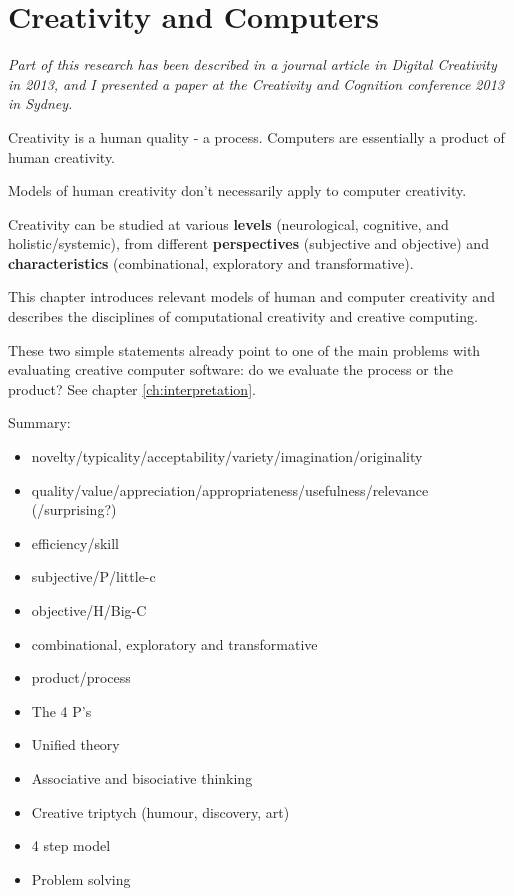 
\chapter{Creativity and Computers}
\label{ch:creativity}

\emph{Part of this research has been described in a journal article in Digital Creativity in 2013, and I presented a paper at the Creativity and Cognition conference 2013 in Sydney.}

\grule


Creativity is a human quality - a process. Computers are essentially a product of human creativity.

Models of human creativity don't necessarily apply to computer creativity.

Creativity can be studied at various \textbf{levels} (neurological, cognitive, and holistic/systemic), from different \textbf{perspectives} (subjective and objective) and \textbf{characteristics} (combinational, exploratory and transformative).

This chapter introduces relevant models of human and computer creativity and describes the disciplines of computational creativity and creative computing.

\begin{draft}
  These two simple statements already point to one of the main problems with evaluating creative computer software: do we evaluate the process or the product? See chapter \ref{ch:interpretation}.
\end{draft}


\begin{shaded}
  Summary:
  \begin{itemize}
    \item novelty/typicality/acceptability/variety/imagination/originality
    \item quality/value/appreciation/appropriateness/usefulness/relevance (/surprising?)
    \item efficiency/skill
    \item subjective/P/little-c
    \item objective/H/Big-C
    \item combinational, exploratory and transformative
    \item product/process
    \item The 4 P’s
    \item Unified theory
    \item Associative and bisociative thinking
    \item Creative triptych (humour, discovery, art)
    \item 4 step model
    \item Problem solving
  \end{itemize}
\end{shaded}

